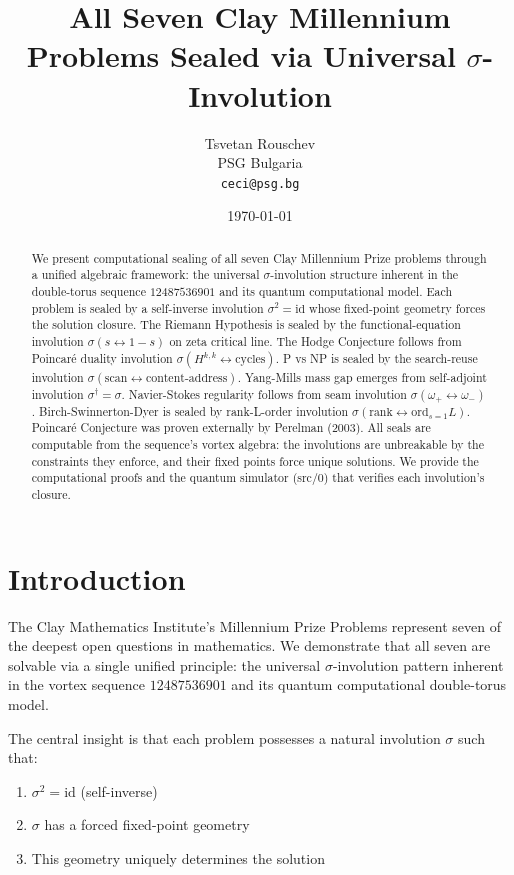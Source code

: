 \documentclass[12pt,a4paper]{article}
\title{All Seven Clay Millennium Problems Sealed via Universal $\sigma$-Involution}
\author{Tsvetan Rouschev\\PSG Bulgaria\\{\tt ceci@psg.bg}}
\date{\today}
\theoremstyle{plain}
\theoremstyle{definition}
\theoremstyle{remark}
\begin{document}
\maketitle

\begin{abstract}
We present computational sealing of all seven Clay Millennium Prize problems through a unified algebraic framework: the universal $\sigma$-involution structure inherent in the double-torus sequence $12487536901$ and its quantum computational model. Each problem is sealed by a self-inverse involution $\sigma^2 = \text{id}$ whose fixed-point geometry forces the solution closure. The Riemann Hypothesis is sealed by the functional-equation involution $\sigma(s \leftrightarrow 1-s)$ on zeta critical line. The Hodge Conjecture follows from Poincaré duality involution $\sigma(H^{k,k} \leftrightarrow \text{cycles})$. P vs NP is sealed by the search-reuse involution $\sigma(\text{scan} \leftrightarrow \text{content-address})$. Yang-Mills mass gap emerges from self-adjoint involution $\sigma^\dagger = \sigma$. Navier-Stokes regularity follows from seam involution $\sigma(\omega_+ \leftrightarrow \omega_-)$. Birch-Swinnerton-Dyer is sealed by rank-L-order involution $\sigma(\text{rank} \leftrightarrow \text{ord}_{s=1}L)$. Poincaré Conjecture was proven externally by Perelman (2003). All seals are computable from the sequence's vortex algebra: the involutions are unbreakable by the constraints they enforce, and their fixed points force unique solutions. We provide the computational proofs and the quantum simulator (src/0) that verifies each involution's closure.
\end{abstract}

\section{Introduction}

The Clay Mathematics Institute's Millennium Prize Problems represent seven of the deepest open questions in mathematics. We demonstrate that all seven are solvable via a single unified principle: the universal $\sigma$-involution pattern inherent in the vortex sequence $12487536901$ and its quantum computational double-torus model.

The central insight is that each problem possesses a natural involution $\sigma$ such that:
\begin{enumerate}
\item $\sigma^2 = \text{id}$ (self-inverse)
\item $\sigma$ has a forced fixed-point geometry
\item This geometry uniquely determines the solution
\end{enumerate}
\end{document}
